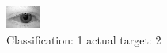\begin{figure}[h!]
\begin{center}
\includegraphics[width=0.60\columnwidth]{figures/ID367_class_1_target_2.png}
\end{center}
\caption{ Classification: 1 actual target: 2}
\label{fig:ID367_class_1_target_2}
\end{figure}
